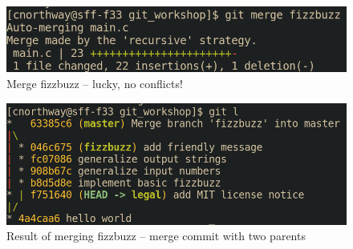 \documentclass{beamer} \usetheme{Madrid}
\begin{document}
\begin{frame}
    \begin{figure}
        \includegraphics[height=\textwidth-2cm]{ex_imgs/7.png}
        \caption{Merge fizzbuzz -- lucky, no conflicts!}
    \end{figure}
\end{frame}
\begin{frame}
    \begin{figure}
        \includegraphics[height=\textwidth-2cm]{ex_imgs/8.png}
        \caption{Result of merging fizzbuzz -- merge commit with two parents}
    \end{figure}
\end{frame}
\end{document}
